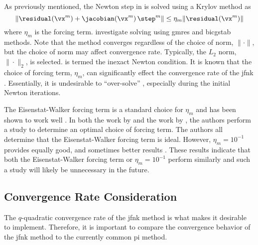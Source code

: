     As previously mentioned, the Newton step in  is solved
    using a Krylov method as
    \begin{equation}
      \label{eq:inexact_newton_condition}
      \| \residual(\vx^m) + \jacobian(\vx^m) \, \step^m \| \le 
        \eta_m \| \residual(\vx^m) \|
    \end{equation}
    where $\eta_m$ is the forcing term. \citeauthor{qe2paper} investigate
    solving  using \gls{gmres} and
    \gls{bicgstab} methods. Note that the method converges regardless of the
    choice of norm, $\| \cdot \|$, but the choice of norm may affect convergence
    rate.  Typically, the $L_2$ norm, $\| \cdot \|_2$, is selected.
     is termed the inexact Newton condition.
    It is known that the choice of forcing term, $\eta_m$, can significantly
    effect the convergence rate of the \gls{jfnk} \cite{textbookkelley}.
    Essentially, it is undesirable to ``over-solve''
    , especially during the initial Newton
    iterations.

    The Eisenstat-Walker forcing term is a standard choice for $\eta_m$ and has
    been shown to work well \cite{qe2paper,gill_azmy}. In both the work by
    \citeauthor{qe2paper} and the work by \citeauthor{gill_azmy}, the authors
    perform a study to determine an optimal choice of forcing term. The authors
    all determine that the Eisenstat-Walker forcing term is ideal. However,
    $\eta_m = 10^{-1}$ provides equally good, and sometimes better results
    \cite{qe2paper,gill_azmy,ma784notes}. These results indicate that both the
    Eisenstat-Walker forcing term or $\eta_m = 10^{-1}$ perform similarly and
    such a study will likely be unnecessary in the future.

  \subsection{Convergence Rate Consideration}
    The $q$-quadratic convergence rate of the \gls{jfnk} method is what makes it
    desirable to implement. Therefore, it is important to compare the
    convergence behavior of the \gls{jfnk} method to the currently common
    \gls{pi} method.

